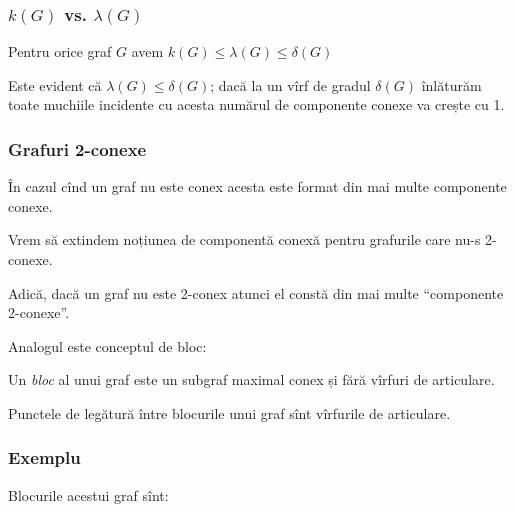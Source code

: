 \begin{frame}
  \frametitle{$k(G)$ vs. $\lambda(G)$}

\begin{theorem} Pentru orice graf $G$ avem 
$k(G)\leq \lambda(G)\leq \delta(G)$
\end{theorem}\pause

Este evident că $\lambda(G)\leq \delta(G)$; dacă la un vîrf de gradul $\delta(G)$ înlăturăm toate muchiile incidente cu acesta numărul de componente conexe va crește cu 1.

\end{frame}

\begin{frame}
  \frametitle{Grafuri 2-conexe}

În cazul cînd un graf nu este conex acesta este format din mai multe componente conexe.\pause

Vrem să extindem noțiunea de componentă conexă pentru grafurile care nu-s 2-conexe.\pause

Adică, dacă un graf nu este 2-conex atunci el constă din mai multe ``componente 2-conexe''.\pause

Analogul este conceptul de bloc:\pause

Un \emph{bloc} al unui graf este un subgraf maximal conex și fără vîrfuri de articulare.\pause

Punctele de legătură între blocurile unui graf sînt vîrfurile de articulare.

\end{frame}

\begin{frame}
  \frametitle{Exemplu}
  
\begin{figure}
\centering%
\end{figure}\pause

Blocurile acestui graf sînt:\pause

\begin{figure}
\centering%
\end{figure}  

\end{frame}

